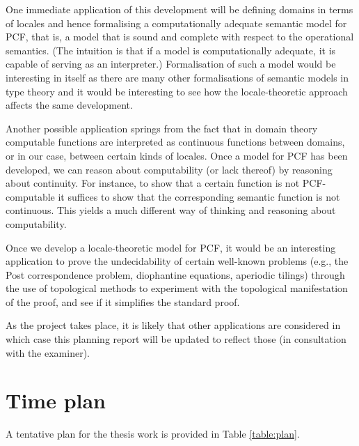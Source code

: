 \documentclass{article}
\begin{document}
One immediate application of this development will be defining domains in terms of locales
and hence formalising a computationally adequate semantic model for PCF, that is, a model
that is sound and complete with respect to the operational semantics. (The intuition is
that if a model is computationally adequate, it is capable of serving as an interpreter.)
Formalisation of such a model would be interesting in itself as there are many other
formalisations of semantic models in type theory and it would be interesting to see how
the locale-theoretic approach affects the same development.

Another possible application springs from the fact that in domain theory computable
functions are interpreted as continuous functions between domains, or in our case, between
certain kinds of locales. Once a model for PCF has been developed, we can reason about
computability (or lack thereof) by reasoning about continuity. For instance, to show that
a certain function is not PCF-computable it suffices to show that the corresponding
semantic function is not continuous. This yields a much different way of thinking and
reasoning about computability.

Once we develop a locale-theoretic model for PCF, it would be an interesting application
to prove the undecidability of certain well-known problems (e.g., the Post correspondence
problem, diophantine equations, aperiodic tilings) through the use of topological methods
to experiment with the topological manifestation of the proof, and see if it simplifies
the standard proof.

As the project takes place, it is likely that other applications are considered in which
case this planning report will be updated to reflect those (in consultation with the
examiner).


\section{Time plan}

A tentative plan for the thesis work is provided in Table \ref{table:plan}.
\end{document}
